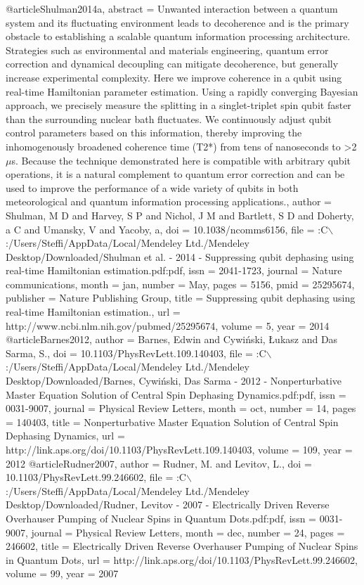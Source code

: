 @article{Shulman2014a,
abstract = {Unwanted interaction between a quantum system and its fluctuating environment leads to decoherence and is the primary obstacle to establishing a scalable quantum information processing architecture. Strategies such as environmental and materials engineering, quantum error correction and dynamical decoupling can mitigate decoherence, but generally increase experimental complexity. Here we improve coherence in a qubit using real-time Hamiltonian parameter estimation. Using a rapidly converging Bayesian approach, we precisely measure the splitting in a singlet-triplet spin qubit faster than the surrounding nuclear bath fluctuates. We continuously adjust qubit control parameters based on this information, thereby improving the inhomogenously broadened coherence time (T2*) from tens of nanoseconds to {\textgreater}2 $\mu$s. Because the technique demonstrated here is compatible with arbitrary qubit operations, it is a natural complement to quantum error correction and can be used to improve the performance of a wide variety of qubits in both meteorological and quantum information processing applications.},
author = {Shulman, M D and Harvey, S P and Nichol, J M and Bartlett, S D and Doherty, a C and Umansky, V and Yacoby, a},
doi = {10.1038/ncomms6156},
file = {:C$\backslash$:/Users/Steffi/AppData/Local/Mendeley Ltd./Mendeley Desktop/Downloaded/Shulman et al. - 2014 - Suppressing qubit dephasing using real-time Hamiltonian estimation.pdf:pdf},
issn = {2041-1723},
journal = {Nature communications},
month = {jan},
number = {May},
pages = {5156},
pmid = {25295674},
publisher = {Nature Publishing Group},
title = {{Suppressing qubit dephasing using real-time Hamiltonian estimation.}},
url = {http://www.ncbi.nlm.nih.gov/pubmed/25295674},
volume = {5},
year = {2014}
}
@article{Barnes2012,
author = {Barnes, Edwin and Cywi{\'{n}}ski, {\L}ukasz and {Das Sarma}, S.},
doi = {10.1103/PhysRevLett.109.140403},
file = {:C$\backslash$:/Users/Steffi/AppData/Local/Mendeley Ltd./Mendeley Desktop/Downloaded/Barnes, Cywi{\'{n}}ski, Das Sarma - 2012 - Nonperturbative Master Equation Solution of Central Spin Dephasing Dynamics.pdf:pdf},
issn = {0031-9007},
journal = {Physical Review Letters},
month = {oct},
number = {14},
pages = {140403},
title = {{Nonperturbative Master Equation Solution of Central Spin Dephasing Dynamics}},
url = {http://link.aps.org/doi/10.1103/PhysRevLett.109.140403},
volume = {109},
year = {2012}
}
@article{Rudner2007,
author = {Rudner, M. and Levitov, L.},
doi = {10.1103/PhysRevLett.99.246602},
file = {:C$\backslash$:/Users/Steffi/AppData/Local/Mendeley Ltd./Mendeley Desktop/Downloaded/Rudner, Levitov - 2007 - Electrically Driven Reverse Overhauser Pumping of Nuclear Spins in Quantum Dots.pdf:pdf},
issn = {0031-9007},
journal = {Physical Review Letters},
month = {dec},
number = {24},
pages = {246602},
title = {{Electrically Driven Reverse Overhauser Pumping of Nuclear Spins in Quantum Dots}},
url = {http://link.aps.org/doi/10.1103/PhysRevLett.99.246602},
volume = {99},
year = {2007}
}
